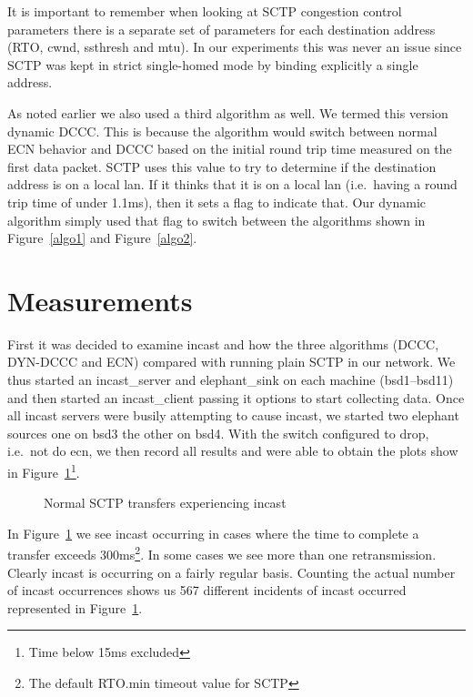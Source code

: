 \documentclass[12pt]{article}
\begin{document}
It is important to remember when looking at SCTP congestion control parameters there
is a separate set of parameters for each destination address (RTO, cwnd, ssthresh and mtu). In
our experiments this was never an issue since SCTP was kept in strict single-homed mode
by binding explicitly a single address. 

As noted earlier we also used a third algorithm as well. We termed this version dynamic DCCC. This
is because the algorithm would switch between normal ECN behavior and DCCC based on the
initial round trip time measured on the first data packet. SCTP uses this value to try to determine
if the destination address is on a local lan. If it thinks that it is on a local lan (i.e.~having a round
trip time of under 1.1ms), then it sets a flag to indicate that. Our dynamic algorithm simply used
that flag to switch between the algorithms shown in Figure~\ref{algo1} and Figure~\ref{algo2}.

\section{Measurements}
\label{measure}
First it was decided to examine incast and how the three algorithms (DCCC, DYN-DCCC and ECN) compared with
running plain SCTP in our network. We thus started an incast\_server and elephant\_sink on each machine (bsd1--bsd11) and then 
started an incast\_client passing it options to start collecting data. Once all incast servers were busily attempting to cause
incast, we started two elephant sources one on bsd3 the other on bsd4. With the switch configured to drop, i.e.~not do ecn, we
then record all results and were able to obtain the plots show in Figure~\ref{fig:noEcnIncast}\footnote{Time below 15ms excluded}.
\begin{figure}[h]
\centering
{}
\caption{Normal SCTP transfers experiencing incast}
\label{fig:noEcnIncast}
\end{figure}


In Figure~\ref{fig:noEcnIncast} we see incast occurring in cases where the time to complete a transfer exceeds
300ms\footnote{The default RTO.min timeout value for SCTP}. In some cases we see more than
one retransmission. Clearly incast is occurring on a fairly regular basis. Counting the actual number
of incast occurrences shows us 567 different incidents of incast occurred represented in Figure~\ref{fig:noEcnIncast}.
\end{document}
